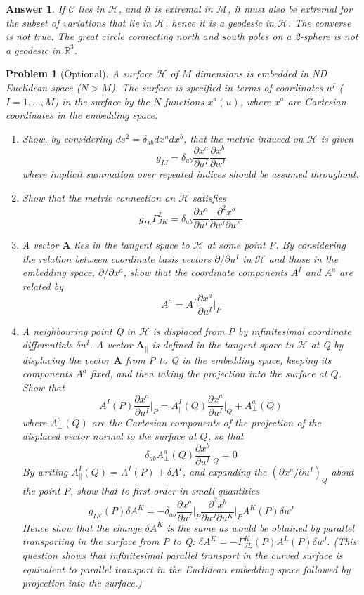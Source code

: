 \documentclass[a4paper]{article}
\theoremstyle{new2}
\newtheorem{ans}{Answer}[section]
\theoremstyle{new}
\newtheorem{qns}{Problem}[section]
\begin{document}
\begin{ans}
If $\mathcal{C}$ lies in $\mathcal{H}$, and it is extremal in $\mathcal{M}$, it must also be extremal for the subset of variations that lie in $\mathcal{H}$, hence it is a geodesic in $\mathcal{H}$. The converse is not true. The great circle connecting north and south poles on a 2-sphere is not a geodesic in $\mathbb{R}^3$.
\end{ans}
\newpage
\begin{qns}[Optional]
A surface $\mathcal{H}$ of $M$ dimensions is embedded in ND Euclidean space ($N > M$). The surface is specified in terms of coordinates $u^I$ ($I =1,\dots, M$) in the surface by the $N$ functions $x^a(u)$, where $x^a$ are Cartesian coordinates in the embedding space.
\begin{enumerate}[label=(\alph*)]
\item Show, by considering $ds^2=\delta_{ab}dx^adx^b$, that the metric induced on $\mathcal{H}$ is given 
$$g_{IJ}=\delta_{ab}\frac{\partial x^a}{\partial u^I}\frac{\partial x^b}{\partial u^J}$$
where implicit summation over repeated indices should be assumed throughout.
\item Show that the metric connection on $\mathcal{H}$ satisfies
$$g_{IL}\Gamma^L_{JK}=\delta_{ab}\frac{\partial x^a}{\partial u^I}\frac{\partial^2x^b}{\partial u^J\partial u^K}$$
\item A vector $\mathbf{A}$ lies in the tangent space to $\mathcal{H}$ at some point P. By considering the relation between coordinate basis vectors $\partial/\partial u^I$ in $\mathcal{H}$ and those in the embedding space, $\partial/\partial x^a$, show that the coordinate components $A^I$ and $A^a$ are related by
$$A^a=A^I\frac{\partial x^a}{\partial u^I}\bigg|_P$$
\item  A neighbouring point Q in $\mathcal{H}$ is displaced from P by infinitesimal coordinate differentials $\delta u^I$. A vector $\mathbf{A}_{\parallel}$ is defined in the tangent space to $\mathcal{H}$ at Q by displacing the vector $\mathbf{A}$ from P to Q in the embedding space, keeping its components $A^a$ fixed, and then taking the projection into the surface at $Q$. Show that
$$A^I(P)\frac{\partial x^a}{\partial u^I}\bigg|_P=A_{\parallel}^I(Q)\frac{\partial x^a}{\partial u^I}\bigg|_Q+A^a_\perp(Q)$$
where $A^a_\perp(Q)$ are the Cartesian components of the projection of the displaced vector normal to the surface at $Q$, so that
$$\delta_{ab}A_\perp^a(Q)\frac{\partial x^b}{\partial u^I}\bigg|_Q=0$$
By writing $A^I_\parallel(Q)=A^I(P)+\delta A^I$, and expanding the $(\partial x^a/\partial u^I)_Q$ about the point P, show that to first-order in small quantities
$$g_{IK}(P)\delta A^K=-\delta_{ab}\frac{\partial x^a}{\partial u^I}\bigg|_P\frac{\partial^2x^b}{\partial u^J\partial u^K}\bigg|_PA^K(P)\delta u^J$$
Hence show that the change $\delta A^K$ is the same as would be obtained by parallel transporting in the surface from P to Q: $\delta A^K=-\Gamma^K_{JL}(P)A^L(P)\delta u^J$. (This question shows that infinitesimal parallel transport in the curved surface is equivalent to parallel transport in the Euclidean embedding space followed by projection into the surface.)
\end{enumerate}
\end{qns}
\end{document}
